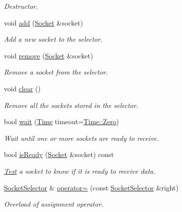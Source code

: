 \begin{DoxyCompactItemize}
\begin{DoxyCompactList}\small\item\em Destructor. \end{DoxyCompactList}\item 
void \hyperlink{classsf_1_1SocketSelector_ade952013232802ff7b9b33668f8d2096}{add} (\hyperlink{classsf_1_1Socket}{Socket} \&socket)
\begin{DoxyCompactList}\small\item\em Add a new socket to the selector. \end{DoxyCompactList}\item 
void \hyperlink{classsf_1_1SocketSelector_a98b6ab693a65b82caa375639232357c1}{remove} (\hyperlink{classsf_1_1Socket}{Socket} \&socket)
\begin{DoxyCompactList}\small\item\em Remove a socket from the selector. \end{DoxyCompactList}\item 
void \hyperlink{classsf_1_1SocketSelector_a76e650acb0199d4be91e90a493fbc91a}{clear} ()
\begin{DoxyCompactList}\small\item\em Remove all the sockets stored in the selector. \end{DoxyCompactList}\item 
bool \hyperlink{classsf_1_1SocketSelector_a9cfda5475f17925e65889394d70af702}{wait} (\hyperlink{classsf_1_1Time}{Time} timeout=\hyperlink{classsf_1_1Time_a8db127b632fa8da21550e7282af11fa0}{Time\-::\-Zero})
\begin{DoxyCompactList}\small\item\em Wait until one or more sockets are ready to receive. \end{DoxyCompactList}\item 
bool \hyperlink{classsf_1_1SocketSelector_a8e67b463db05eadb4d356992c896833c}{is\-Ready} (\hyperlink{classsf_1_1Socket}{Socket} \&socket) const 
\begin{DoxyCompactList}\small\item\em \hyperlink{classTest}{Test} a socket to know if it is ready to receive data. \end{DoxyCompactList}\item 
\hyperlink{classsf_1_1SocketSelector}{Socket\-Selector} \& \hyperlink{classsf_1_1SocketSelector_ae6395c7a8d29a9ea14939cc5d1ba3a33}{operator=} (const \hyperlink{classsf_1_1SocketSelector}{Socket\-Selector} \&right)
\begin{DoxyCompactList}\small\item\em Overload of assignment operator. \end{DoxyCompactList}\end{DoxyCompactItemize}


